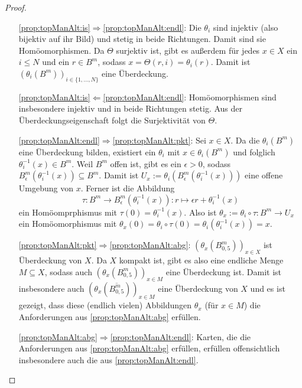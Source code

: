 \begin{proof}
\begin{itemize}
	\item[\ref*{prop:topManAlt:is}$\Rightarrow$\ref*{prop:topManAlt:endl}:] Die $\theta_i$ sind injektiv (also bijektiv auf ihr Bild) und stetig in beide Richtungen. Damit sind sie Homöomorphismen. Da $\Theta$ surjektiv ist, gibt es außerdem für jedes $x \in X$ ein $i \leq N$ und ein $r \in B^m$, sodass $x = \Theta(r,i) = \theta_i(r)$. Damit ist $(\theta_i(B^m))_{i\in\{1,\dots,N\}}$ eine Überdeckung.
	
	\item[\ref*{prop:topManAlt:is}$\Leftarrow$\ref*{prop:topManAlt:endl}:] Homöomorphismen sind insbesondere injektiv und in beide Richtungen stetig. Aus der Überdeckungseigenschaft folgt die Surjektivität von $\Theta$.
	
	\item[\ref*{prop:topManAlt:endl}$\Rightarrow$\ref*{prop:topManAlt:pkt}:] Sei $x \in X$. Da die $\theta_i(B^m)$ eine Überdeckung bilden, existiert ein $\theta_i$ mit $x \in \theta_i(B^m)$ und folglich $\theta_i^{-1}(x) \in B^m$. Weil $B^m$ offen ist, gibt es ein $\epsilon > 0$, sodass $B_\epsilon^m(\theta_i^{-1}(x)) \subseteq B^m$. Damit ist $U_x := \theta_i(B_\epsilon^m(\theta_i^{-1}(x)))$ eine offene Umgebung von $x$. Ferner ist die Abbildung
	\[\tau: B^m \to B_\epsilon^m(\theta_i^{-1}(x)): r \mapsto  \epsilon r + \theta_i^{-1}(x)\]
ein Homöomprphismus mit $\tau(0) = \theta_i^{-1}(x)$. Also ist $\theta_x := \theta_i \circ \tau: B^m \to U_x$ ein Homöomorphismus mit $\theta_x(0) = \theta_i \circ \tau(0) = \theta_i(\theta_i^{-1}(x)) = x$.
	
	\item[\ref*{prop:topManAlt:pkt}$\Rightarrow$\ref*{prop:topManAlt:abg}:] $(\theta_x(B_{0,5}^m))_{x\in X}$ ist Überdeckung von $X$. Da $X$ kompakt ist, gibt es also eine endliche Menge $M \subseteq X$, sodass auch $(\theta_x(B_{0,5}^m))_{x\in M}$ eine Überdeckung ist. Damit ist insbesondere auch $(\theta_x(\overline{B_{0,5}^m}))_{x\in M}$ eine Überdeckung von $X$ und es ist gezeigt, dass diese (endlich vielen) Abbildungen $\theta_x$ (für $x \in M$) die Anforderungen aus \ref*{prop:topManAlt:abg} erfüllen.

	\item[\ref*{prop:topManAlt:abg}$\Rightarrow$\ref*{prop:topManAlt:endl}:]Karten, die die Anforderungen aus \ref*{prop:topManAlt:abg} erfüllen, erfüllen offensichtlich insbesondere auch die aus \ref*{prop:topManAlt:endl}.	
\end{itemize}
\end{proof}

